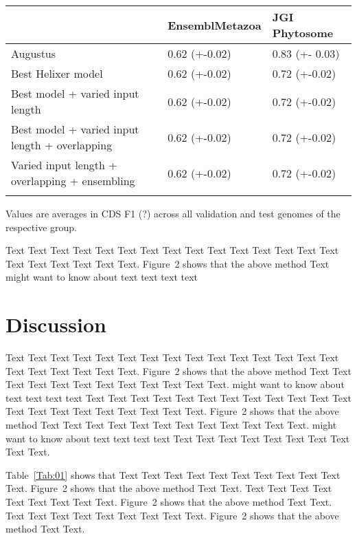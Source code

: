 \documentclass{bioinfo}
\begin{document}
\begin{table}[!t]
 {
\begin{tabular}{@{}lll@{}}
\toprule & EnsemblMetazoa & JGI Phytosome\\
\midrule
Augustus & 0.62 (+-0.02) & 0.83 (+- 0.03)\\
Best Helixer model & 0.62 (+-0.02) & 0.72 (+-0.02) \\
Best model + varied input length & 0.62 (+-0.02) & 0.72 (+-0.02) \\
Best model + varied input length + overlapping & 0.62 (+-0.02) & 0.72 (+-0.02) \\
Varied input length + overlapping + ensembling & 0.62 (+-0.02) & 0.72 (+-0.02) \\
\botrule
\end{tabular}}{Values are averages in CDS F1 (?) across all validation and test genomes of the \\ respective group.}
\end{table}

Text Text Text Text Text Text  Text Text Text Text Text Text Text
Text Text  Text Text Text Text Text Text.
Figure~2\vphantom{\ref{fig:02}} shows that the above method  Text
\citealp{Boffelli03} might want to know about  text text text text


\section{Discussion}

Text Text Text Text Text Text  Text Text Text Text Text Text Text
Text Text  Text Text Text Text Text Text.
Figure~2\vphantom{\ref{fig:02}} shows that the above method  Text
Text Text Text  Text Text Text Text Text Text  Text Text.
\citealp{Boffelli03} might want to know about  text text text text
Text Text Text Text Text Text  Text Text Text Text Text Text Text
Text Text  Text Text Text Text Text Text.
Figure~2\vphantom{\ref{fig:02}} shows that the above method  Text
Text Text Text  Text Text Text Text Text Text  Text Text.
\citealp{Boffelli03} might want to know about  text text text text
Text Text Text Text Text Text Text Text Text Text.




Table~\ref{Tab:01} shows that Text Text Text Text Text  Text Text
Text Text Text Text. Figure~2\vphantom{\ref{fig:02}} shows that
the above method Text Text. Text Text Text  Text Text Text Text
Text Text. Figure~2\vphantom{\ref{fig:02}} shows that the above
method Text Text. Text Text Text  Text Text Text Text Text Text.
Figure~2\vphantom{\ref{fig:02}} shows that the above method Text
Text.
\end{document}
